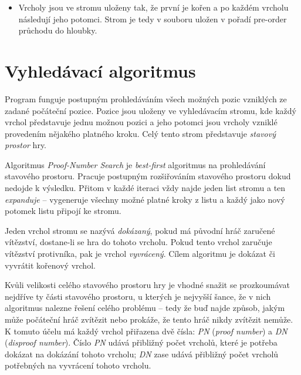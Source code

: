 \documentclass{article}
\begin{document}
\begin{itemize}
  \item Vrcholy jsou ve stromu uloženy tak, že první je kořen a po každém vrcholu následují jeho potomci. Strom je tedy
  v souboru uložen v pořadí pre-order průchodu do hloubky.
\end{itemize}

\section{Vyhledávací algoritmus}
Program funguje postupným prohledáváním všech možných pozic vzniklých ze zadané počáteční pozice. Pozice jsou uloženy ve
vyhledávacím stromu, kde každý vrchol představuje jednu možnou pozici a jeho potomci jsou vrcholy vzniklé provedením
nějakého platného kroku. Celý tento strom představuje \emph{stavový prostor} hry.

Algoritmus \emph{Proof-Number Search} je \emph{best-first} algoritmus na prohledávání stavového prostoru. Pracuje
postupným rozšiřováním stavového prostoru dokud nedojde k výsledku. Přitom v každé iteraci vždy najde jeden list stromu
a ten \emph{expanduje} -- vygeneruje všechny možné platné kroky z listu a každý jako nový potomek listu připojí ke
stromu.

Jeden vrchol stromu se nazývá \emph{dokázaný}, pokud má původní hráč zaručené vítězství, dostane-li se hra do tohoto
vrcholu. Pokud tento vrchol zaručuje vítězství protivníka, pak je vrchol \emph{vyvrácený}. Cílem algoritmu je dokázat či
vyvrátit kořenový vrchol.

Kvůli velikosti celého stavového prostoru hry je vhodné snažit se prozkoumávat nejdříve ty části stavového prostoru, u
kterých je nejvyšší šance, že v nich algoritmus nalezne řešení celého problému -- tedy že buď najde způsob, jakým může
počáteční hráč zvítězit nebo prokáže, že tento hráč nikdy zvítězit nemůže. K tomuto účelu má každý vrchol přiřazena dvě
čísla: \emph{PN} (\emph{proof number}) a \emph{DN} (\emph{disproof number}). Číslo \emph{PN} udává přibližný počet
vrcholů, které je potřeba dokázat na dokázání tohoto vrcholu; \emph{DN} zase udává přibližný počet vrcholů potřebných na
vyvrácení tohoto vrcholu.
\end{document}
